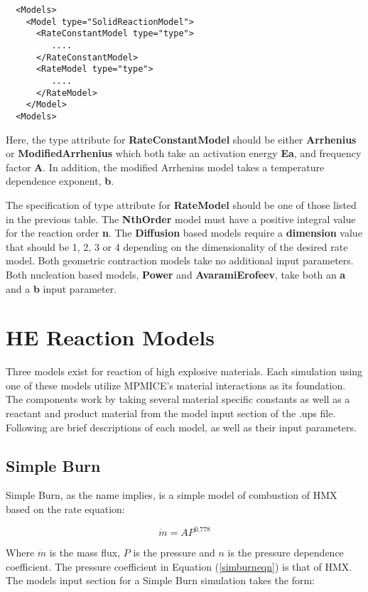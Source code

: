 \begin{lstlisting}
  <Models>
    <Model type="SolidReactionModel">
      <RateConstantModel type="type">
         ....
      </RateConstantModel>
      <RateModel type="type">
         ....
      </RateModel>
    </Model>
  <Models>
\end{lstlisting}

\noindent Here, the type attribute for \textbf{RateConstantModel} should be either \textbf{Arrhenius} or \textbf{ModifiedArrhenius}
which both take an activation energy \textbf{Ea}, and frequency factor \textbf{A}.  In addition, the modified Arrhenius
model takes a temperature dependence exponent, \textbf{b}.

The specification of type attribute for \textbf{RateModel} should be one of those listed in the previous table.
The \textbf{NthOrder} model must have a positive integral value for the reaction order \textbf{n}. 
The \textbf{Diffusion} based models require a \textbf{dimension} value that should be 1, 2, 3 or 4 depending
on the dimensionality of the desired rate model.  Both geometric contraction models take no additional
input parameters. Both nucleation based models, \textbf{Power} and \textbf{AvaramiErofeev}, take both 
an \textbf{a} and a \textbf{b} input parameter. 

\section{HE Reaction Models}

Three models exist for reaction of high explosive materials.  Each
simulation using one of these models utilize MPMICE's material
interactions as its foundation.  The components work by taking several
material specific constants as well as a reactant and product material
from the model input section of the .ups file.  Following are brief
descriptions of each model, as well as their input parameters.

\subsection{Simple Burn} \label{Sec:SimpleBurn}

Simple Burn, as the name implies, is a simple model of combustion of HMX based on the rate equation:

\begin{equation}
\dot{m}=A P^{0.778}
\label{simburneqn}
\end{equation}

Where $\dot{m}$ is the mass flux, $P$ is the pressure and $n$ is the pressure dependence coefficient.  The pressure coefficient in Equation (\ref{simburneqn}) is that of HMX.  The models input section for a Simple Burn simulation takes the form: 

